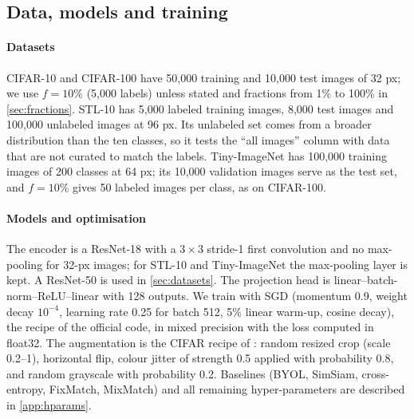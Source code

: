\subsection{Data, models and training}
\paragraph{Datasets}
CIFAR-10 and CIFAR-100 \citep{krizhevsky2009cifar} have 50,000 training and 10,000 test images of 32 px; we
use $f=10\%$ (5,000 labels) unless stated and fractions from 1\% to 100\% in \cref{sec:fractions}. STL-10
\citep{coates2011analysis} has 5,000 labeled training images, 8,000 test images and 100,000 unlabeled images
at 96 px. Its unlabeled set comes from a broader distribution than the ten classes, so it tests the
``all images'' column with data that are not curated to match the labels. Tiny-ImageNet \citep{le2015tiny} has
100,000 training images of 200 classes at 64 px; its 10,000 validation images serve as the test set, and
$f=10\%$ gives 50 labeled images per class, as on CIFAR-100.

\paragraph{Models and optimisation}
The encoder is a ResNet-18 \citep{he2016resnet} with a $3\times3$ stride-1 first convolution and no max-pooling
for 32-px images; for STL-10 and Tiny-ImageNet the max-pooling layer is kept. A ResNet-50 is used in \cref{sec:datasets}. The
projection head is linear--batch-norm--ReLU--linear with 128 outputs. We train with SGD (momentum 0.9,
weight decay $10^{-4}$, learning rate 0.25 for batch 512, 5\% linear warm-up, cosine decay), the recipe of the
official \supcon code, in mixed precision with the loss computed in float32. The augmentation is the CIFAR
recipe of \citet{chen2020simclr}: random resized crop (scale 0.2--1), horizontal flip, colour jitter of
strength 0.5 applied with probability 0.8, and random grayscale with probability 0.2. Baselines (BYOL,
SimSiam, cross-entropy, FixMatch, MixMatch) and all remaining hyper-parameters are described in
\ref{app:hparams}.

